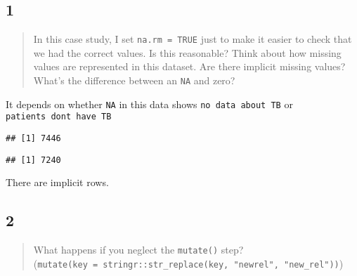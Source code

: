 \documentclass[]{ltjsarticle}
\newenvironment{Shaded}{\begin{snugshade}}{\end{snugshade}}
\newcommand{\KeywordTok}[1]{\textcolor[rgb]{0.13,0.29,0.53}{\textbf{#1}}}
\newcommand{\NormalTok}[1]{#1}
\newcommand{\OperatorTok}[1]{\textcolor[rgb]{0.81,0.36,0.00}{\textbf{#1}}}
\newcommand{\StringTok}[1]{\textcolor[rgb]{0.31,0.60,0.02}{#1}}
\begin{document}
\hypertarget{section-17}{%
\subsection{1}\label{section-17}}

\begin{quote}
In this case study, I set \texttt{na.rm\ =\ TRUE} just to make it easier
to check that we had the correct values. Is this reasonable? Think about
how missing values are represented in this dataset. Are there implicit
missing values? What's the difference between an \texttt{NA} and zero?
\end{quote}

It depends on whether \texttt{NA} in this data shows
\texttt{no\ data\ about\ TB} or
\texttt{patients\ don\textquotesingle{}t\ have\ TB}

\begin{Shaded}
\end{Shaded}

\begin{verbatim}
## [1] 7446
\end{verbatim}

\begin{Shaded}
\end{Shaded}

\begin{verbatim}
## [1] 7240
\end{verbatim}

There are implicit rows.

\hypertarget{section-18}{%
\subsection{2}\label{section-18}}

\begin{quote}
What happens if you neglect the \texttt{mutate()} step?
(\texttt{mutate(key\ =\ stringr::str\_replace(key,\ "newrel",\ "new\_rel"))})
\end{quote}
\end{document}
